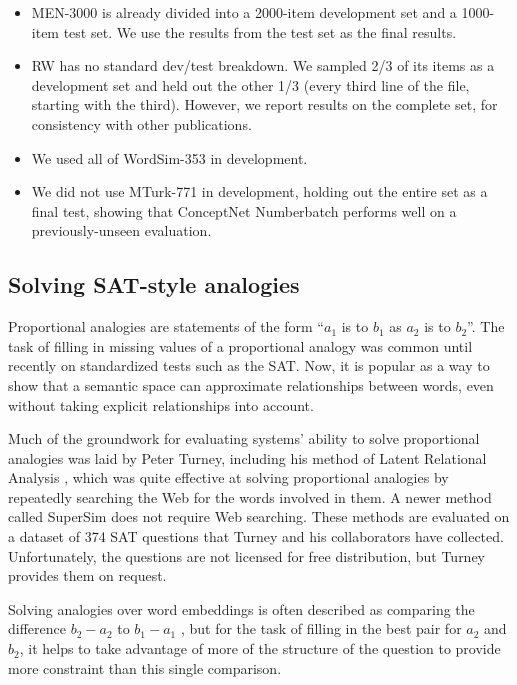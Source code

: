 \documentclass[letterpaper]{article}
\begin{document}
\begin{itemize}
\item
    MEN-3000 is already divided into a 2000-item development set and a
    1000-item test set. We use the results from the test set as the final results.
\item
    RW has no standard dev/test breakdown. We sampled 2/3 of its items as
    a development set and held out the other 1/3 (every third line of the file,
    starting with the third). However, we report results on the complete set,
    for consistency with other publications.
\item
    We used all of WordSim-353 in development.
\item
    We did not use MTurk-771 in development, holding out the entire set
    as a final test, showing that ConceptNet Numberbatch performs well on a
    previously-unseen evaluation.
\end{itemize}

\subsection{Solving SAT-style analogies}

Proportional analogies are statements of the form ``$a_1$ is to $b_1$ as $a_2$
is to $b_2$''. The task of filling in missing values of a proportional analogy
was common until recently on standardized tests such as the SAT. Now, it is
popular as a way to show that a semantic space can approximate relationships
between words, even without taking explicit relationships into account.

Much of the groundwork for evaluating systems' ability to solve proportional
analogies was laid by Peter Turney, including his method of Latent Relational
Analysis \cite{turney2005lra}, which was quite effective at solving
proportional analogies by repeatedly searching the Web for the words involved
in them. A newer method called SuperSim \cite{turney2013distributional} does
not require Web searching. These methods are evaluated on a dataset of 374 SAT
questions that Turney and his collaborators have collected. Unfortunately, the
questions are not licensed for free distribution, but Turney provides them on
request.

Solving analogies over word embeddings is often described as comparing the
difference $b_2 - a_2$ to $b_1 - a_1$ \cite{mikolov2013word2vec}, but for the
task of filling in the best pair for $a_2$ and $b_2$, it helps to take
advantage of more of the structure of the question to provide more constraint
than this single comparison.
\end{document}
